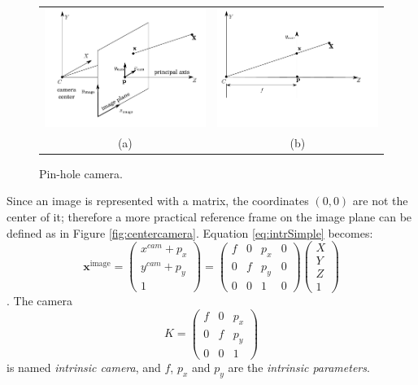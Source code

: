 \begin{figure}[t]
 \begin{tabular}{cc}
  \includegraphics[width=0.48\columnwidth]{./img/ch-camera/camera}&
  \includegraphics[width=0.48\columnwidth]{./img/ch-camera/camera01}\\
  (a)&(b)
 \end{tabular}
 \caption{Pin-hole camera.}
 \label{fig:pinhole}
\end{figure}
Since an image is represented with a matrix, the coordinates $(0,0)$ are not the center of it; therefore a more practical reference frame on the image plane can be defined as in Figure \ref{fig:centercamera}. Equation \eqref{eq:intrSimple} becomes:
\begin{equation}
\label{eq:intrCompl}
 \mathbf{x}^{\text{image}} = 
 \begin{pmatrix}
 x^{cam} + p_x\\
 y^{cam} + p_y\\
 1
 \end{pmatrix} =
 \begin{pmatrix}
 f&0&p_x&0\\
 0&f&p_y&0\\
 0&0&1&0
 \end{pmatrix} 
 \begin{pmatrix}
 X\\
 Y\\
 Z\\
 1
 \end{pmatrix}
\end{equation}.
The camera 
\begin{equation}
K = 
\begin{pmatrix}
 f&0&p_x\\
 0&f&p_y\\
 0&0&1
 \end{pmatrix} 
\end{equation}
is named \emph{intrinsic camera}, and $f$, $p_x$ and $p_y$ are the \emph{intrinsic parameters}. 

